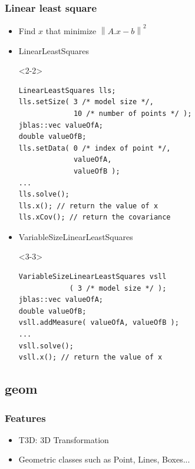 \documentclass[pdf]{beamer}
\begin{document}

\begin{frame}[fragile]
  \frametitle{Linear least square}
  \begin{itemize}
    \item<1-> Find $ x $ that minimize $ \left\| A.x - b \right\|^2 $
    \item<2-> LinearLeastSquares
      \begin{onlyenv}<2-2>
        \begin{lstlisting}
LinearLeastSquares lls;
lls.setSize( 3 /* model size */,
             10 /* number of points */ );
jblas::vec valueOfA;
double valueOfB;
lls.setData( 0 /* index of point */,
             valueOfA,
             valueOfB );
...
lls.solve();
lls.x(); // return the value of x
lls.xCov(); // return the covariance
        \end{lstlisting}
      \end{onlyenv}
    \item<3-> VariableSizeLinearLeastSquares
      \begin{onlyenv}<3-3>
        \begin{lstlisting}
VariableSizeLinearLeastSquares vsll
            ( 3 /* model size */ );
jblas::vec valueOfA;
double valueOfB;
vsll.addMeasure( valueOfA, valueOfB );
...
vsll.solve();
vsll.x(); // return the value of x
        \end{lstlisting}
      \end{onlyenv}
  \end{itemize}

\end{frame}


\subsection{geom}
\begin{frame}
  \frametitle{Features}
  \begin{itemize}
   \item<1-> T3D: 3D Transformation
   \item<2-> Geometric classes such as Point, Lines, Boxes...
  \end{itemize}
\end{frame}
\end{document}
